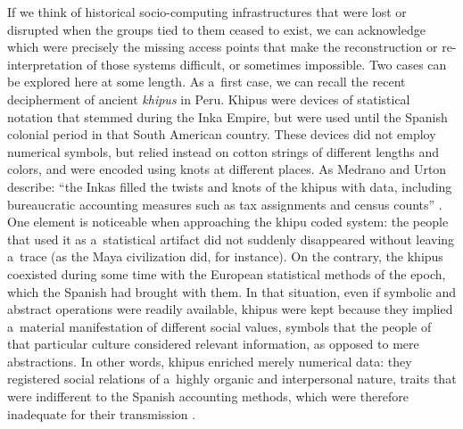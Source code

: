 If we think of historical socio-computing infrastructures that were lost or disrupted when the groups tied to them ceased to exist, we can acknowledge which were precisely the missing access points that make the reconstruction or re-interpretation of those systems difficult, or sometimes impossible. Two cases can be explored here at some length. As a~first case, we can recall the recent decipherment of ancient \textit{khipus} in Peru. Khipus were devices of statistical notation that stemmed during the Inka Empire, but were used until the Spanish colonial period in that South American country. These devices did not employ numerical symbols, but relied instead on cotton strings of different lengths and colors, and were encoded using knots at different places. As Medrano and Urton describe: ``the Inkas filled the twists and knots of the khipus with data, including bureaucratic accounting measures such as tax assignments and census counts''
\parencite[][p.2]{medrano_toward_2018}. %
 One element is noticeable when approaching the khipu coded system: the people that used it as a~statistical artifact did not suddenly disappeared without leaving a~trace (as the Maya civilization did, for instance). On the contrary, the khipus coexisted during some time with the European statistical methods of the epoch, which the Spanish had brought with them. In that situation, even if symbolic and abstract operations were readily available, khipus were kept because they implied a~material manifestation of different social values, symbols that the people of that particular culture considered relevant information, as opposed to mere abstractions. In other words, khipus enriched merely numerical data: they registered social relations of a~highly organic and interpersonal nature, traits that were indifferent to the Spanish accounting methods, which were therefore inadequate for their transmission 
\parencite[][p.12]{medrano_toward_2018}.%


